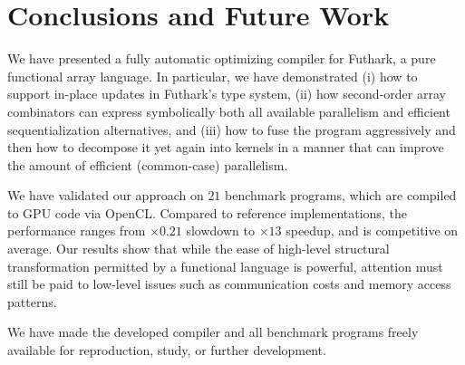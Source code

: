 \chapter{Conclusions and Future Work}
\label{chap:conclusions}

We have presented a fully automatic optimizing compiler for Futhark, a
pure functional array language.  In particular, we have demonstrated
(i) how to support in-place updates in Futhark's type system, (ii) how
second-order array combinators can express symbolically both all
available parallelism and efficient sequentialization alternatives,
and (iii) how to fuse the program aggressively and then how to
decompose it yet again into kernels in a manner that can improve the
amount of efficient (common-case) parallelism.

We have validated our approach on $21$ benchmark programs, which are
compiled to GPU code via OpenCL. Compared to reference
implementations, the performance ranges from $\times0.21$ slowdown to
$\times13$ speedup, and is competitive on average.
%
Our results show that while the ease of high-level structural
transformation permitted by a functional language is powerful,
attention must still be paid to low-level issues such as communication
costs and memory access patterns.

We have made the developed compiler and all benchmark programs freely
available for reproduction, study, or further development.

